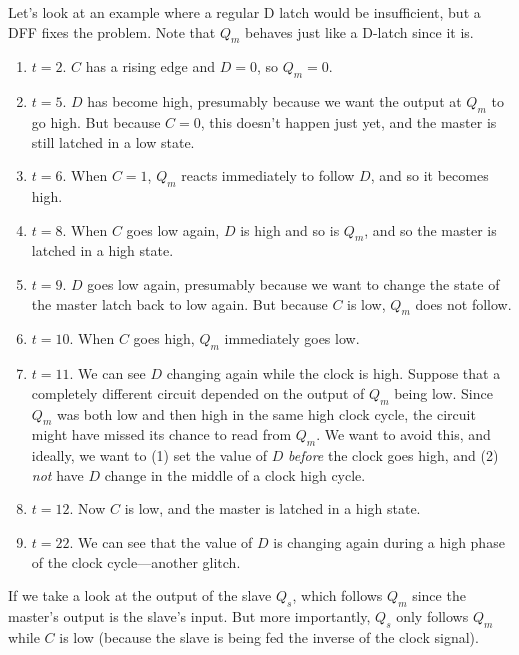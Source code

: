   \begin{example}
    Let's look at an example where a regular D latch would be insufficient, but a DFF fixes the problem. Note that $Q_m$ behaves just like a D-latch since it is.
    \begin{enumerate}
      \item $t = 2$. $C$ has a rising edge and $D = 0$, so $Q_m = 0$. 
      \item $t = 5$. $D$ has become high, presumably because we want the output at $Q_m$ to go high. But because $C = 0$, this doesn't happen just yet, and the master is still latched in a low state. 
      \item $t = 6$. When $C = 1$, $Q_m$ reacts immediately to follow $D$, and so it becomes high. 
      \item $t = 8$. When $C$ goes low again, $D$ is high and so is $Q_m$, and so the master is latched in a high state. 
      \item $t = 9$. $D$ goes low again, presumably because we want to change the state of the master latch back to low again. But because $C$ is low, $Q_m$ does not follow. 
      \item $t = 10$. When $C$ goes high, $Q_m$ immediately goes low. 
      \item $t = 11$. We can see $D$ changing again while the clock is high. Suppose that a completely different circuit depended on the output of $Q_m$ being low. Since $Q_m$ was both low and then high in the same high clock cycle, the circuit might have missed its chance to read from $Q_m$. We want to avoid this, and ideally, we want to (1) set the value of $D$ \textit{before} the clock goes high, and (2) \textit{not} have $D$ change in the middle of a clock high cycle. \item $t = 12$. Now $C$ is low, and the master is latched in a high state. 
      \item $t = 22$. We can see that the value of $D$ is changing again during a high phase of the clock cycle---another glitch. 
    \end{enumerate}
    If we take a look at the output of the slave $Q_s$, which follows $Q_m$ since the master's output is the slave's input. But more importantly, $Q_s$ only follows $Q_m$ while $C$ is low (because the slave is being fed the inverse of the clock signal). 


\end{example}
